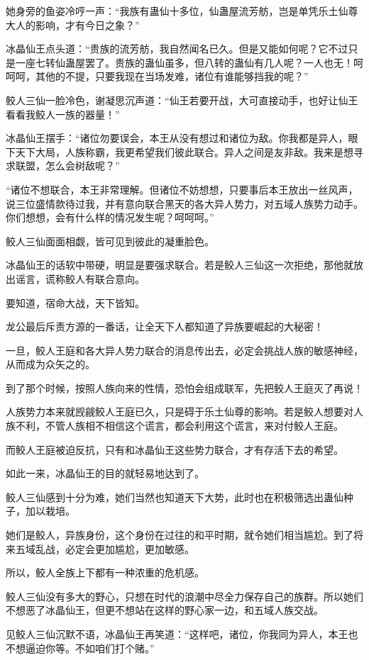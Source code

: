 \begin{this_body}
她身旁的鱼姿冷哼一声：“我族有蛊仙十多位，仙蛊屋流芳舫，岂是单凭乐土仙尊大人的影响，才有今日之象？”

冰晶仙王点头道：“贵族的流芳舫，我自然闻名已久。但是又能如何呢？它不过只是一座七转仙蛊屋罢了。贵族的蛊仙虽多，但八转的蛊仙有几人呢？一人也无！呵呵呵，其他的不提，只要我现在当场发难，诸位有谁能够挡我的呢？”

鲛人三仙一脸冷色，谢凝思沉声道：“仙王若要开战，大可直接动手，也好让仙王看看我鲛人一族的器量！”

冰晶仙王摆手：“诸位勿要误会，本王从没有想过和诸位为敌。你我都是异人，眼下天下大局，人族称霸，我更希望我们彼此联合。异人之间是友非敌。我来是想寻求联盟，怎么会树敌呢？”

“诸位不想联合，本王非常理解。但诸位不妨想想，只要事后本王放出一丝风声，说三位盛情款待过我，并有意向联合黑天的各大异人势力，对五域人族势力动手。你们想想，会有什么样的情况发生呢？呵呵呵。”

鲛人三仙面面相觑，皆可见到彼此的凝重脸色。

冰晶仙王的话软中带硬，明显是要强求联合。若是鲛人三仙这一次拒绝，那他就放出谣言，谎称鲛人有联合意向。

要知道，宿命大战，天下皆知。

龙公最后斥责方源的一番话，让全天下人都知道了异族要崛起的大秘密！

一旦，鲛人王庭和各大异人势力联合的消息传出去，必定会挑战人族的敏感神经，从而成为众矢之的。

到了那个时候，按照人族向来的性情，恐怕会组成联军，先把鲛人王庭灭了再说！

人族势力本来就觊觎鲛人王庭已久，只是碍于乐土仙尊的影响。若是鲛人想要对人族不利，不管人族相不相信这个谎言，都会利用这个谎言，来对付鲛人王庭。

而鲛人王庭被迫反抗，只有和冰晶仙王这些势力联合，才有存活下去的希望。

如此一来，冰晶仙王的目的就轻易地达到了。

鲛人三仙感到十分为难，她们当然也知道天下大势，此时也在积极筛选出蛊仙种子，加以栽培。

她们是鲛人，异族身份，这个身份在过往的和平时期，就令她们相当尴尬。到了将来五域乱战，必定会更加尴尬，更加敏感。

所以，鲛人全族上下都有一种浓重的危机感。

鲛人三仙没有多大的野心，只想在时代的浪潮中尽全力保存自己的族群。所以她们不想恶了冰晶仙王，但更不想站在这样的野心家一边，和五域人族交战。

见鲛人三仙沉默不语，冰晶仙王再笑道：“这样吧，诸位，你我同为异人，本王也不想逼迫你等。不如咱们打个赌。”


\end{this_body}
